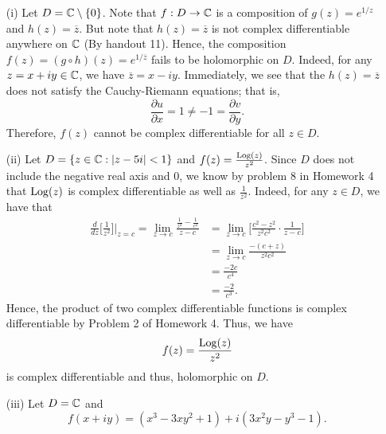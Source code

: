 \documentclass[a4paper]{article}
\begin{document}
\begin{solution}
\begin{enumerate}
    \item[(i)] Let \( D = \mathbb{C} \setminus  \{ 0 \}  \). Note that \( f: D \to \mathbb{C}   \) is a composition of \( g(z) =  e^{1/z} \) and \( h(z) =  \overline{z} \). But note that \( h(z) =  \overline{z} \) is not complex differentiable anywhere on \( \mathbb{C}  \) (By handout 11). Hence, the composition \( f(z) = (g \circ h)(z) = e^{1 / \overline{z}}  \) fails to be holomorphic on \( D  \). Indeed, for any \( z = x + i y \in \mathbb{C}  \), we have \( \overline{z } = x - i y \). Immediately, we see that the \( h(z) =  \overline{z} \) does not satisfy the Cauchy-Riemann equations; that is, 
        \[  \frac{\partial u }{\partial x }  = 1 \neq -1 =  \frac{\partial v }{\partial y }.  \]
        Therefore, \( f(z) \) cannot be complex differentiable for all \( z \in D  \). 
    \item[(ii)] Let \( D = \{ z \in \mathbb{C} : | z - 5i |  < 1 \}  \) and \( f(z) = \frac{ \operatorname{Log}(z) }{ z^{2} } \). Since \( D  \) does not include the negative real axis and \( 0  \), we know by problem 8 in Homework 4 that \( \operatorname{Log}(z) \) is complex differentiable as well as \( \frac{ 1 }{ z^{2} }  \). Indeed, for any \( z \in D \), we have that    
        \begin{align*}
            \frac{ d }{ dz  }  \Big[ \frac{ 1 }{ z^{2} } \Big] \Big|_{z = c}  = \lim_{ z \to c }  \frac{ \frac{ 1 }{ z^{2} }  - \frac{ 1 }{ c^{2} }  }{ z - c } &= \lim_{ z \to c }  \Big[ \frac{  c^{2} - z^{2} }{ z^{2} c^{2} } \cdot \frac{ 1  }{  z - c  } \Big] \\
                                                                                            &= \lim_{ z \to c } \frac{ - (c+z)  }{ z^{2} c^{2} }  \\
                                                                                            &= \frac{ -2c }{ c^{4}  }  \\
                                                                                            &= \frac{ -2  }{ c^{3} }.
        \end{align*}
        Hence, the product of two complex differentiable functions is complex differentiable by Problem 2 of Homework 4. Thus, we have 
        \[  f(z) = \frac{ \operatorname{Log}(z) }{ z^{2} }  \]
        is complex differentiable and thus, holomorphic on \( D  \). 
    \item[(iii)] Let \( D = \mathbb{C}  \) and
        \[  f(x+iy) = (x^{3} - 3x y^{2} + 1) + i (3 x^{2} y - y^{3} - 1). \]

\end{enumerate}
\end{solution}
\end{document}
